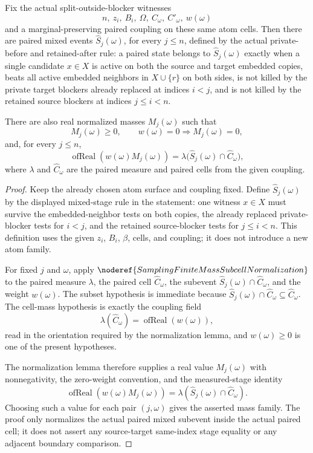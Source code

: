 \begin{helper}
Fix the actual split-outside-blocker witnesses
\[
  n,\ z_i,\ B_i,\ \Omega,\ C_\omega,\ C'_\omega,\ w(\omega)
\]
and a marginal-preserving paired coupling on these same atom cells.  Then
there are paired mixed events \(\widehat S_j(\omega)\), for every
\(j\le n\), defined by the actual private-before and retained-after rule:
a paired state belongs to \(\widehat S_j(\omega)\) exactly when a single
candidate \(x\in X\) is active on both the source and target embedded copies,
beats all active embedded neighbors in \(X\cup\{r\}\) on both sides, is not
killed by the private target blockers already replaced at indices \(i<j\),
and is not killed by the retained source blockers at indices \(j\le i<n\).

There are also real normalized masses \(M_j(\omega)\) such that
\[
  M_j(\omega)\ge 0,\qquad
  w(\omega)=0\Rightarrow M_j(\omega)=0,
\]
and, for every \(j\le n\),
\[
  \operatorname{ofReal}(w(\omega)M_j(\omega))
  =
  \lambda\bigl(\widehat S_j(\omega)\cap\widehat C_\omega\bigr),
\]
where \(\lambda\) and \(\widehat C_\omega\) are the paired measure and paired
cells from the given coupling.
\end{helper}
\begin{proof}
Keep the already chosen atom surface and coupling fixed.  Define
\(\widehat S_j(\omega)\) by the displayed mixed-stage rule in the statement:
one witness \(x\in X\) must survive the embedded-neighbor tests on both
copies, the already replaced private-blocker tests for \(i<j\), and the
retained source-blocker tests for \(j\le i<n\).  This definition uses the
given \(z_i\), \(B_i\), \(\beta\), cells, and coupling; it does not introduce
a new atom family.

For fixed \(j\) and \(\omega\), apply
\(\noderef{SamplingFiniteMassSubcellNormalization}\) to the paired measure
\(\lambda\), the paired cell \(\widehat C_\omega\), the subevent
\(\widehat S_j(\omega)\cap\widehat C_\omega\), and the weight
\(w(\omega)\).  The subset hypothesis is immediate because
\(\widehat S_j(\omega)\cap\widehat C_\omega\subseteq\widehat C_\omega\).  The
cell-mass hypothesis is exactly the coupling field
\[
  \lambda(\widehat C_\omega)=\operatorname{ofReal}(w(\omega)),
\]
read in the orientation required by the normalization lemma, and
\(w(\omega)\ge0\) is one of the present hypotheses.

The normalization lemma therefore supplies a real value \(M_j(\omega)\) with
nonnegativity, the zero-weight convention, and the measured-stage identity
\[
  \operatorname{ofReal}(w(\omega)M_j(\omega))
  =
  \lambda(\widehat S_j(\omega)\cap\widehat C_\omega).
\]
Choosing such a value for each pair \((j,\omega)\) gives the asserted mass
family.  The proof only normalizes the actual paired mixed subevent inside
the actual paired cell; it does not assert any source-target same-index stage
equality or any adjacent boundary comparison.
\end{proof}

